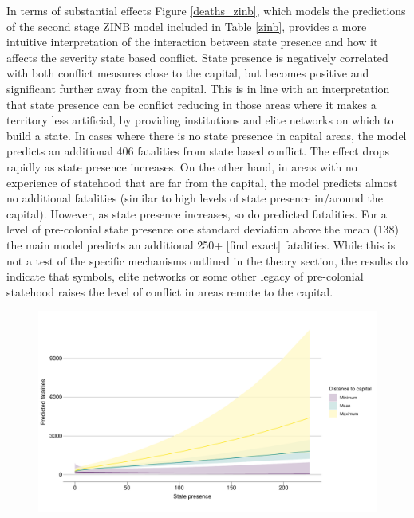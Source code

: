\documentclass[12pt]{article}
\begin{document}
In terms of substantial effects Figure \ref{deaths_zinb}, which models the
predictions of the second stage ZINB model included in Table \ref{zinb},
provides a more intuitive interpretation of the interaction between state
presence and how it affects the severity state based conflict. State presence is
negatively correlated with both conflict measures close to the capital, but
becomes positive and significant further away from the capital. This is in line
with an interpretation that state presence can be conflict reducing in those
areas where it makes a territory less artificial, by providing institutions and
elite networks on which to build a state. In cases where there is no state
presence in capital areas, the model predicts an additional 406 fatalities from
state based conflict. The effect drops rapidly as state presence increases. On
the other hand, in areas with no experience of statehood that are far from the
capital, the model predicts almost no additional fatalities (similar to high
levels of state presence in/around the capital). However, as state presence
increases, so do predicted fatalities. For a level of pre-colonial state
presence one standard deviation above the mean (138) the main model predicts an
additional 250+ [find exact]
fatalities. While this is not a test of the specific mechanisms outlined in the
theory section, the results do indicate that symbols, elite networks or
some other legacy of pre-colonial statehood raises the level of conflict
in areas remote to the capital.


\begin{figure}[htpb] \centering
	\includegraphics[width=\linewidth]{"../R/Output/deathsInterPlot.pdf"}
	\caption{}
	\label{interdeaths}
\end{figure}
\end{document}
